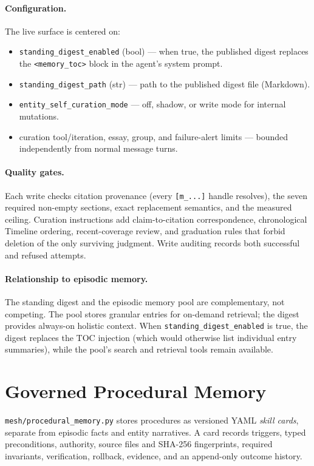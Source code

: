 \documentclass[11pt,letterpaper]{report}
\newcommand{\code}[1]{\texttt{#1}}
\begin{document}
\paragraph{Configuration.}
The live surface is centered on:
\begin{itemize}[nosep]
  \item \code{standing\_digest\_enabled} (bool) --- when true, the
        published digest replaces the \code{<memory\_toc>} block in the
        agent's system prompt.
  \item \code{standing\_digest\_path} (str) --- path to the published
        digest file (Markdown).
  \item \code{entity\_self\_curation\_mode} --- off, shadow, or write mode
        for internal mutations.
  \item curation tool/iteration, essay, group, and failure-alert limits ---
        bounded independently from normal message turns.
\end{itemize}

\paragraph{Quality gates.}
Each write checks citation provenance (every \code{[m\_...]} handle resolves),
the seven required non-empty sections, exact replacement semantics, and the
measured ceiling. Curation instructions add claim-to-citation correspondence,
chronological Timeline ordering, recent-coverage review, and graduation rules
that forbid deletion of the only surviving judgment. Write auditing records
both successful and refused attempts.

\paragraph{Relationship to episodic memory.}
The standing digest and the episodic memory pool are complementary, not
competing. The pool stores granular entries for on-demand retrieval; the
digest provides always-on holistic context. When \code{standing\_digest\_enabled}
is true, the digest replaces the TOC injection (which would otherwise
list individual entry summaries), while the pool's search and retrieval
tools remain available.

\section{Governed Procedural Memory}

\code{mesh/procedural\_memory.py} stores procedures as versioned YAML
\emph{skill cards}, separate from episodic facts and entity narratives. A card
records triggers, typed preconditions, authority, source files and SHA-256
fingerprints, required invariants, verification, rollback, evidence, and an
append-only outcome history.
\end{document}
